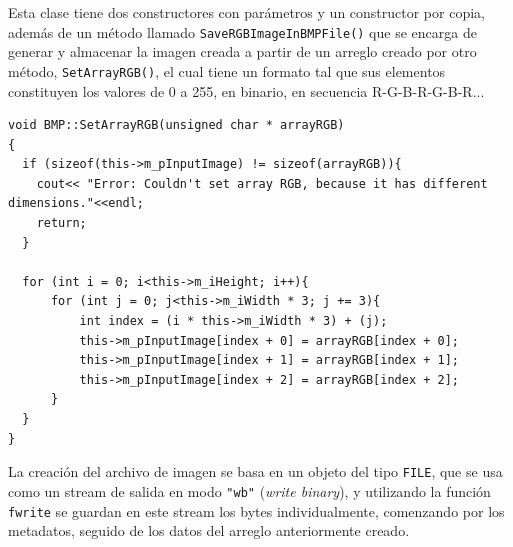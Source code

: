 Esta clase tiene dos constructores con parámetros y un constructor por copia, además de un método llamado \texttt{SaveRGBImageInBMPFile()} que se encarga de generar y almacenar la imagen creada a partir de un arreglo creado por otro método, \texttt{SetArrayRGB()}, el cual tiene un formato tal que sus elementos constituyen los valores de 0 a 255, en binario, en secuencia R-G-B-R-G-B-R...

\begin{verbatim}
void BMP::SetArrayRGB(unsigned char * arrayRGB)
{
  if (sizeof(this->m_pInputImage) != sizeof(arrayRGB)){
    cout<< "Error: Couldn't set array RGB, because it has different dimensions."<<endl;
    return;
  }

  for (int i = 0; i<this->m_iHeight; i++){
      for (int j = 0; j<this->m_iWidth * 3; j += 3){
          int index = (i * this->m_iWidth * 3) + (j);
          this->m_pInputImage[index + 0] = arrayRGB[index + 0];
          this->m_pInputImage[index + 1] = arrayRGB[index + 1];
          this->m_pInputImage[index + 2] = arrayRGB[index + 2];
      }
  }
}
\end{verbatim}

La creación del archivo de imagen se basa en un objeto del tipo \texttt{FILE}, que se usa como un stream de salida en modo \texttt{"wb"} (\textit{write binary}), y utilizando la función \texttt{fwrite} se guardan en este stream los bytes individualmente, comenzando por los metadatos, seguido de los datos del arreglo anteriormente creado.


